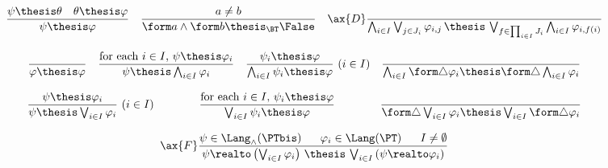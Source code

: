 \begin{figure}[t!]
\[
\begin{array}{c}

\dfrac{\psi \thesis \theta
  \quad
  \theta \thesis \varphi}
  {\psi \thesis \varphi}

\quad

\dfrac{a \neq b}
  {\form a \land \form b \thesis_{\BT} \False}

\quad

\ax{D}
\dfrac{}
  {\bigwedge_{i \in I}\bigvee_{j \in J_i} \varphi_{i,j}
  \,\thesis\,
  \bigvee_{f \in \prod_{i \in I} J_i}\bigwedge_{i \in I} \varphi_{i,f(i)}}

\\\\

\dfrac{}
  {\varphi \thesis \varphi}

\quad

\dfrac{\text{for each $i \in I$, $\psi \thesis \varphi_i$}}
  {\psi \thesis \bigwedge_{i \in I} \varphi_i}

\quad

\dfrac{\psi_i \thesis \varphi}
  {\bigwedge_{i \in I} \psi_i \thesis \varphi}
~(i \in I)

\quad

\dfrac{}
  {\bigwedge_{i \in I} \form\triangle \varphi_i
  \thesis
  \form\triangle \bigwedge_{i \in I} \varphi_i}

\\\\

\dfrac{\psi \thesis \varphi_i}
  {\psi \thesis \bigvee_{i \in I} \varphi_i}
~(i \in I)

\qquad\qquad

\dfrac{\text{for each $i \in I$, $\psi_i \thesis \varphi$}}
  {\bigvee_{i \in I}\psi_i \thesis \varphi}

\qquad\qquad

\dfrac{}
  {\form\triangle \bigvee_{i \in I}\varphi_i
  \thesis
  \bigvee_{i \in I} \form\triangle\varphi_i}

\\\\

\ax{F}
\dfrac{\psi \in \Lang_\land(\PTbis)
  \quad~~
  \varphi_i \in \Lang(\PT)
  \quad~~
  I \neq \emptyset}
  {\psi \realto \left( \bigvee_{i \in I}\varphi_i \right)
  \,\thesis\,
  \bigvee_{i \in I} \left( \psi \realto \varphi_i \right) }


\end{array}\]
\end{figure}
